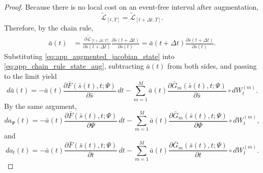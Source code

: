 \documentclass[11pt]{article}
\theoremstyle{definition}
\numberwithin{equation}{section}
\numberwithin{theorem}{section}
\numberwithin{proposition}{section}
\numberwithin{lemma}{section}
\numberwithin{corollary}{section}
\numberwithin{definition}{section}
\numberwithin{remark}{section}
\newcommand{\1}{\mathbbm{1}}
\begin{document}
\begin{proof}
Because there is no local cost on an event-free interval after augmentation,
\[
\tilde{\mathcal L}_{[t,T]}
=
\tilde{\mathcal L}_{[t+\Delta t,T]}.
\]
Therefore, by the chain rule,
\begin{align}
\bar a(t)
&=
\frac{\partial \tilde{\mathcal L}_{[t+\Delta t,T]}}{\partial \bar s(t+\Delta t)}
\frac{\partial \bar s(t+\Delta t)}{\partial \bar s(t)}
=
\bar a(t+\Delta t)
\frac{\partial \bar s(t+\Delta t)}{\partial \bar s(t)}.
\label{eq:app_chain_rule_state_aug}
\end{align}
Substituting \eqref{eq:app_augmented_jacobian_state} into \eqref{eq:app_chain_rule_state_aug}, subtracting $\bar a(t)$ from both sides, and passing to the limit yield
\begin{equation}
\label{eq:app_augmented_adjoint_state}
d\bar a(t)
=
-\bar a(t)\frac{\partial \bar F(\bar s(t),t;\Psi)}{\partial \bar s}\,dt
-\sum_{m=1}^M
\bar a(t)\frac{\partial \bar G_m(\bar s(t),t;\Psi)}{\partial \bar s}\circ dW_t^{(m)}.
\end{equation}
By the same argument,
\begin{equation}
\label{eq:app_augmented_adjoint_param}
da_\Psi(t)
=
-\bar a(t)\frac{\partial \bar F(\bar s(t),t;\Psi)}{\partial \Psi}\,dt
-\sum_{m=1}^M
\bar a(t)\frac{\partial \bar G_m(\bar s(t),t;\Psi)}{\partial \Psi}\circ dW_t^{(m)},
\end{equation}
and
\begin{equation}
\label{eq:app_augmented_adjoint_time}
da_t(t)
=
-\bar a(t)\frac{\partial \bar F(\bar s(t),t;\Psi)}{\partial t}\,dt
-\sum_{m=1}^M
\bar a(t)\frac{\partial \bar G_m(\bar s(t),t;\Psi)}{\partial t}\circ dW_t^{(m)}.
\end{equation}


\end{proof}
\end{document}
